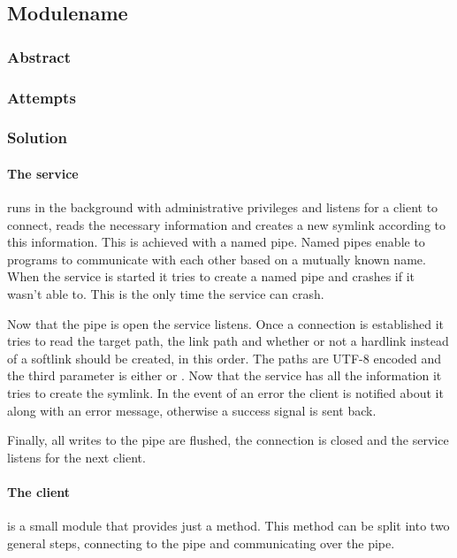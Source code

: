 \subsection{Modulename}%
\label{subsec:mod:pywinlink}
\def\kapitelautor{}

\subsubsection{Abstract}

\subsubsection{Attempts}

\subsubsection{Solution} %

\paragraph{The service} runs in the background with administrative privileges
and listens for a client to connect, reads the necessary information and
creates a new symlink according to this information. This is achieved with a
named pipe. Named pipes enable to programs to communicate with each other based
on a mutually known name. When the service is started it tries to create a
named pipe and crashes if it wasn't able to. This is the only time the service
can crash.

Now that the pipe is open the service listens. Once a connection is established
it tries to read the target path, the link path and whether or not a hardlink
instead of a softlink should be created, in this order. The paths are UTF-8
encoded and the third parameter is either  or .
Now that the service has all the information it tries to create the symlink. In
the event of an error the client is notified about it along with an error
message, otherwise a success signal is sent back.

Finally, all writes to the pipe are flushed, the connection is closed and the
service listens for the next client.

\paragraph{The client} is a small module that provides just a 
method. This method can be split into two general steps, connecting to the pipe
and communicating over the pipe.

